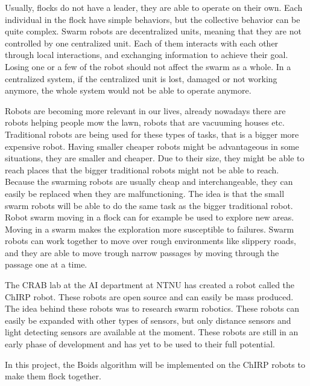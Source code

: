 Usually, flocks do not have a leader, they are able to operate on their own. Each individual in the flock have simple behaviors, but the collective behavior can be quite complex. Swarm robots are decentralized units, meaning that they are not controlled by one centralized unit. Each of them interacts with each other through local interactions, and exchanging information to achieve their goal. Losing one or a few of the robot should not affect the swarm as a whole. In a centralized system, if the centralized unit is lost, damaged or not working anymore, the whole system would not be able to operate anymore.

Robots are becoming more relevant in our lives, already nowadays there are robots helping people mow the lawn, robots that are vacuuming houses etc. 
Traditional robots are being used for these types of tasks, that is a bigger more expensive robot. Having smaller cheaper robots might be advantageous in some situations, they are smaller and cheaper. Due to their size, they might be able to reach places that the bigger traditional robots might not be able to reach. Because the swarming robots are usually cheap and interchangeable, they can easily be replaced when they are malfunctioning. The idea is that the small swarm robots will be able to do the same task as the bigger traditional robot. Robot swarm moving in a flock can for example be used to explore new areas. Moving in a swarm makes the exploration more susceptible to failures. Swarm robots can work together to move over rough environments like slippery roads, and they are able to move trough narrow passages by moving through the passage one at a time.

The CRAB lab at the AI department at NTNU has created a robot called the ChIRP robot. These robots are open source and can easily be mass produced. The idea behind these robots was to research swarm robotics.
These robots can easily be expanded with other types of sensors, but only distance sensors and light detecting sensors are available at the moment. These robots are still in an early phase of development and has yet to be used to their full potential. 

In this project, the Boids algorithm will be implemented on the ChIRP robots to make them flock together. 



